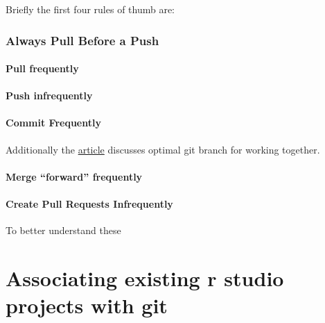 \documentclass[
  letterpaper,
  DIV=11,
  numbers=noendperiod]{scrartcl}
\let\oldparagraph\paragraph
\renewcommand{\paragraph}[1]{\oldparagraph{#1}\mbox{}}
\begin{document}
Briefly the first four rules of thumb are:

\hypertarget{always-pull-before-a-push}{%
\subsubsection{\texorpdfstring{\textbf{Always Pull Before a
Push}}{Always Pull Before a Push}}\label{always-pull-before-a-push}}

\hypertarget{pull-frequently}{%
\paragraph{\texorpdfstring{\textbf{Pull
frequently}}{Pull frequently}}\label{pull-frequently}}

\hypertarget{push-infrequently}{%
\paragraph{\texorpdfstring{\textbf{Push
infrequently}}{Push infrequently}}\label{push-infrequently}}

\hypertarget{commit-frequently}{%
\paragraph{\texorpdfstring{\textbf{Commit
Frequently}}{Commit Frequently}}\label{commit-frequently}}

Additionally the
\href{https://betterprogramming.pub/six-rules-for-good-git-hygiene-5006cf9e9e2}{article}
discusses optimal git branch for working together.

\hypertarget{merge-forward-frequently}{%
\paragraph{\texorpdfstring{\textbf{Merge ``forward''
frequently}}{Merge ``forward'' frequently}}\label{merge-forward-frequently}}

\hypertarget{create-pull-requests-infrequently}{%
\paragraph{\texorpdfstring{\textbf{Create Pull Requests
Infrequently}}{Create Pull Requests Infrequently}}\label{create-pull-requests-infrequently}}

To better understand these

\hypertarget{associating-existing-r-studio-projects-with-git}{%
\section{Associating existing r studio projects with
git}\label{associating-existing-r-studio-projects-with-git}}
\end{document}
